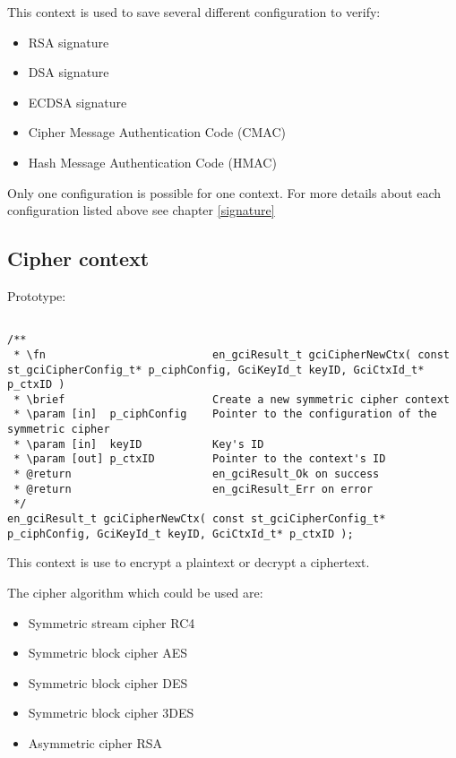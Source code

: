This context is used to save several different configuration to verify:
\begin{itemize}
  \item RSA signature
  \item DSA signature
  \item ECDSA signature
  \item Cipher Message Authentication Code (CMAC)
  \item Hash Message Authentication Code (HMAC)
\end{itemize}

Only one configuration is possible for one context. 
\newline
For more details about each configuration listed above see chapter
\ref{signature}



\subsection{Cipher context}

Prototype:
\begin{lstlisting}

/**
 * \fn							en_gciResult_t gciCipherNewCtx( const st_gciCipherConfig_t* p_ciphConfig, GciKeyId_t keyID, GciCtxId_t* p_ctxID )
 * \brief						Create a new symmetric cipher context
 * \param [in]	p_ciphConfig	Pointer to the configuration of the symmetric cipher
 * \param [in]  keyID			Key's ID
 * \param [out] p_ctxID			Pointer to the context's ID
 * @return						en_gciResult_Ok on success
 * @return						en_gciResult_Err on error
 */
en_gciResult_t gciCipherNewCtx( const st_gciCipherConfig_t* p_ciphConfig, GciKeyId_t keyID, GciCtxId_t* p_ctxID );

\end{lstlisting}

This context is use to encrypt a plaintext or decrypt a ciphertext.

The cipher algorithm which could be used are:
\begin{itemize}
  \item Symmetric stream cipher RC4
  \item Symmetric block cipher AES
  \item Symmetric block cipher DES
  \item Symmetric block cipher 3DES
  \item Asymmetric cipher RSA
\end{itemize}

